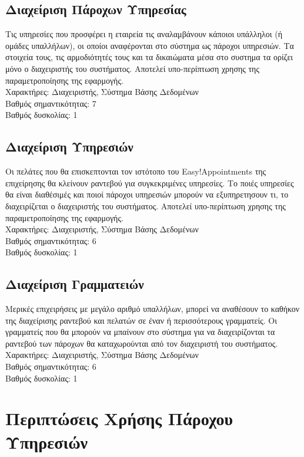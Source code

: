 \documentclass[12pt]{article}
\begin{document}
\subsection{Διαχείριση Πάροχων Υπηρεσίας}
Τις υπηρεσίες που προσφέρει η εταιρεία τις αναλαμβάνουν κάποιοι υπάλληλοι (ή ομάδες υπαλλήλων), οι οποίοι αναφέρονται στο σύστημα ως πάροχοι υπηρεσιών. Τα στοιχεία τους, τις αρμοδιότητές τους και τα δικαιώματα μέσα στο συστημα τα ορίζει μόνο ο διαχειριστής του συστήματος. Αποτελεί υπο-περίπτωση χρησης της παραμετροποίησης της εφαρμογής.
\\[0.3cm]
Χαρακτήρες: Διαχειριστής, Σύστημα Βάσης Δεδομένων
\\[0.3cm]
Βαθμός σημαντικότητας: 7
\\[0.3cm]
Βαθμός δυσκολίας: 1

\subsection{Διαχείριση Υπηρεσιών}
Οι πελάτες που θα επισκεπτονται τον ιστότοπο του Easy!Appointments της επιχείρησης θα κλείνουν ραντεβού για συγκεκριμένες υπηρεσίες. Το ποιές υπηρεσίες θα είναι διαθέσιμές και ποιοί πάροχοι υπηρεσιών μπορούν να εξυπηρετησουν τι, το διαχειρίζεται ο διαχειριστής του συστήματος. Αποτελεί υπο-περίπτωση χρησης της παραμετροποίησης της εφαρμογής.
\\[0.3cm]
Χαρακτήρες: Διαχειριστής, Σύστημα Βάσης Δεδομένων
\\[0.3cm]
Βαθμός σημαντικότητας: 6 
\\[0.3cm]
Βαθμός δυσκολίας: 1

\subsection{Διαχείριση Γραμματειών}
Μερικές επιχειρήσεις με μεγάλο αριθμό υπαλλήλων, μπορεί να αναθέσουν το καθήκον της διαχείρισης ραντεβού και πελατών σε έναν ή περισσότερους γραμματείς. Οι γραμματείς που θα μπορούν να μπαίνουν στο σύστημα για να διαχειρίζονται τα ραντεβού των πάροχων θα καταχωρούνται από τον διαχειριστή του συστήματος.
\\[0.3cm]
Χαρακτήρες: Διαχειριστής, Σύστημα Βάσης Δεδομένων
\\[0.3cm]
Βαθμός σημαντικότητας: 6 
\\[0.3cm]
Βαθμός δυσκολίας: 1

\section {Περιπτώσεις Χρήσης Πάροχου Υπηρεσιών}
\end{document}
